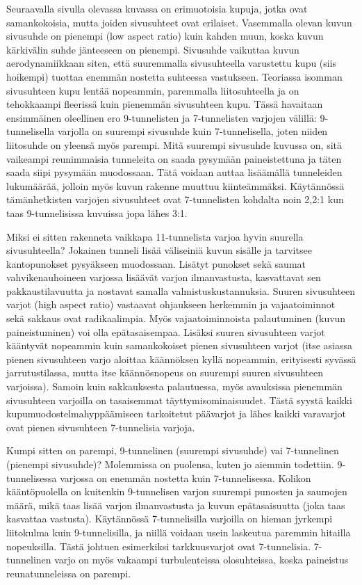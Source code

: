 Seuraavalla sivulla olevassa kuvassa on erimuotoisia kupuja, jotka ovat samankokoisia, mutta joiden sivusuhteet ovat erilaiset. Vasemmalla olevan kuvun sivusuhde on pienempi (low aspect ratio) kuin kahden muun, koska kuvun kärkivälin suhde jänteeseen on pienempi. Sivusuhde vaikuttaa kuvun aerodynamiikkaan siten, että suuremmalla sivusuhteella varustettu kupu (siis hoikempi) tuottaa enemmän nostetta suhteessa vastukseen. Teoriassa isomman sivusuhteen kupu lentää nopeammin, paremmalla liitosuhteella ja on tehokkaampi fleerissä kuin pienemmän sivusuhteen kupu. Tässä havaitaan ensimmäinen oleellinen ero 9-tunnelisten ja 7-tunnelisten varjojen välillä: 9-tunnelisella varjolla on suurempi sivusuhde kuin 7-tunnelisella, joten niiden liitosuhde on yleensä myös parempi. Mitä suurempi sivusuhde kuvussa on, sitä vaikeampi reunimmaisia tunneleita on saada pysymään paineistettuna ja täten saada siipi pysymään muodossaan. Tätä voidaan auttaa lisäämällä tunneleiden lukumäärää, jolloin myös kuvun rakenne muuttuu kiinteämmäksi. Käytännössä tämänhetkisten varjojen sivusuhteet ovat 7-tunnelisten kohdalta noin 2,2:1 kun taas 9-tunnelisissa kuvuissa jopa lähes 3:1. 


Miksi ei sitten rakenneta vaikkapa 11-tunnelista varjoa hyvin suurella sivusuhteella? Jokainen tunneli lisää väliseiniä kuvun sisälle ja tarvitsee kantopunokset pysyäkseen muodossaan. Lisätyt punokset sekä saumat vahvikenauhoineen varjossa lisäävät varjon ilmanvastusta, kasvattavat sen pakkaustilavuutta ja nostavat samalla valmistuskustannuksia. Suuren sivusuhteen varjot (high aspect ratio) vastaavat ohjaukseen herkemmin ja vajaatoiminnot sekä sakkaus ovat radikaalimpia. Myös vajaatoiminnoista palautuminen (kuvun paineistuminen) voi olla epätasaisempaa. Lisäksi suuren sivusuhteen varjot kääntyvät nopeammin kuin samankokoiset pienen sivusuhteen varjot (itse asiassa pienen sivusuhteen varjo aloittaa käännöksen kyllä nopeammin, erityisesti syvässä jarrutustilassa, mutta itse käännösnopeus on suurempi suuren sivusuhteen varjoissa). Samoin kuin sakkauksesta palautuessa, myös avauksissa pienemmän sivusuhteen varjoilla on tasaisemmat täyttymisominaisuudet. Tästä syystä kaikki kupumuodostelmahyppäämiseen tarkoitetut päävarjot ja lähes kaikki varavarjot ovat pienen sivusuhteen 7-tunnelisia varjoja. 


Kumpi sitten on parempi, 9-tunnelinen (suurempi sivusuhde) vai 7-tunnelinen (pienempi sivusuhde)? Molemmissa on puolensa, kuten jo aiemmin todettiin. 9-tunnelisessa varjossa on enemmän nostetta kuin 7-tunnelisessa. Kolikon kääntöpuolella on kuitenkin 9-tunnelisen varjon suurempi punosten ja saumojen määrä, mikä taas lisää varjon ilmanvastusta ja kuvun epätasaisuutta (joka taas kasvattaa vastusta). Käytännössä 7-tunnelisilla varjoilla on hieman jyrkempi liitokulma kuin 9-tunnelisilla, ja niillä voidaan usein laskeutua paremmin hitailla nopeuksilla. Tästä johtuen esimerkiksi tarkkuusvarjot ovat 7-tunnelisia. 7-tunnelinen varjo on myös vakaampi turbulenteissa olosuhteissa, koska paineistus reunatunneleissa on parempi. 

